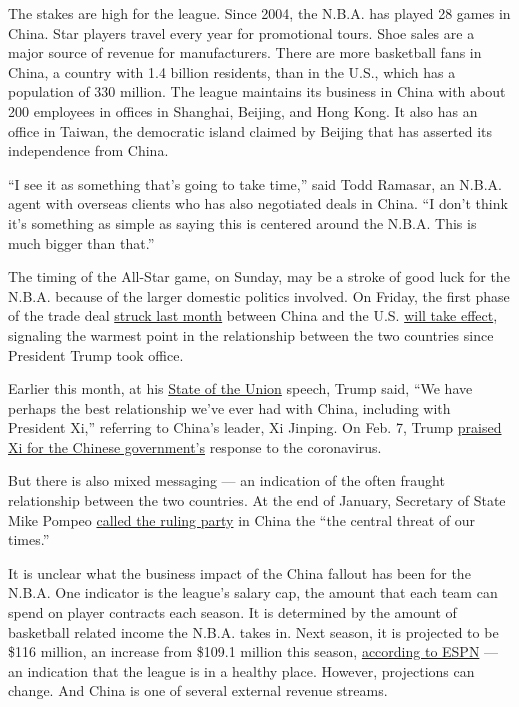The stakes are high for the league. Since 2004, the N.B.A. has played 28
games in China. Star players travel every year for promotional tours.
Shoe sales are a major source of revenue for manufacturers. There are
more basketball fans in China, a country with 1.4 billion residents,
than in the U.S., which has a population of 330 million. The league
maintains its business in China with about 200 employees in offices in
Shanghai, Beijing, and Hong Kong. It also has an office in Taiwan, the
democratic island claimed by Beijing that has asserted its independence
from China.

``I see it as something that's going to take time,'' said Todd Ramasar,
an N.B.A. agent with overseas clients who has also negotiated deals in
China. ``I don't think it's something as simple as saying this is
centered around the N.B.A. This is much bigger than that.''

The timing of the All-Star game, on Sunday, may be a stroke of good luck
for the N.B.A. because of the larger domestic politics involved. On
Friday, the first phase of the trade deal
\href{https://www.nytimes.com/2020/01/15/business/economy/china-trade-deal.html}{struck
last month} between China and the U.S.
\href{https://www.nytimes.com/2020/01/15/business/economy/china-trade-deal-text.html}{will
take effect}, signaling the warmest point in the relationship between
the two countries since President Trump took office.

Earlier this month, at his
\href{https://www.nytimes.com/2020/02/05/us/politics/state-of-union-transcript.html}{State
of the Union} speech, Trump said, ``We have perhaps the best
relationship we've ever had with China, including with President Xi,''
referring to China's leader, Xi Jinping. On Feb. 7, Trump
\href{https://twitter.com/realDonaldTrump/status/1225728755248828416}{praised
Xi for the Chinese government's} response to the coronavirus.

But there is also mixed messaging --- an indication of the often fraught
relationship between the two countries. At the end of January, Secretary
of State Mike Pompeo
\href{https://www.nytimes.com/2020/01/30/world/europe/pompeo-uk-china-huawei.html}{called
the ruling party} in China the ``the central threat of our times.''

It is unclear what the business impact of the China fallout has been for
the N.B.A. One indicator is the league's salary cap, the amount that
each team can spend on player contracts each season. It is determined by
the amount of basketball related income the N.B.A. takes in. Next
season, it is projected to be \$116 million, an increase from \$109.1
million this season,
\href{https://twitter.com/wojespn/status/1222991117869887490?s=20}{according
to ESPN} --- an indication that the league is in a healthy place.
However, projections can change. And China is one of several external
revenue streams.

